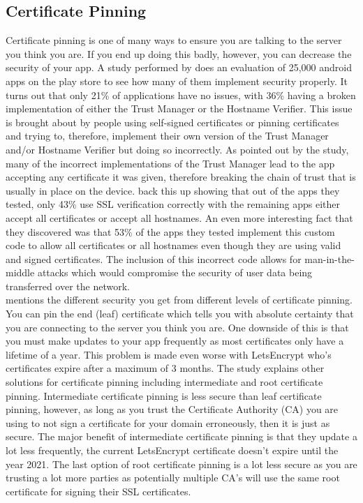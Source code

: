 \documentclass[10pt, a4paper]{article}
\begin{document}
\subsection{Certificate Pinning}
Certificate pinning is one of many ways to ensure you are talking to the server you think you are. If you end up doing this badly, however, you can decrease the security of your app. A study performed by \cite{Buhov2016} does an evaluation of 25,000 android apps on the play store to see how many of them implement security properly. It turns out that only 21\% of applications have no issues, with 36\% having a broken implementation of either the Trust Manager or the Hostname Verifier. This issue is brought about by people using self-signed certificates or pinning certificates and trying to, therefore, implement their own version of the Trust Manager and/or Hostname Verifier but doing so incorrectly. As pointed out by the study, many of the incorrect implementations of the Trust Manager lead to the app accepting any certificate it was given, therefore breaking the chain of trust that is usually in place on the device. \cite{Tendulkar2014} back this up showing that out of the apps they tested, only 43\% use SSL verification correctly with the remaining apps either accept all certificates or accept all hostnames. An even more interesting fact that they discovered was that 53\% of the apps they tested implement this custom code to allow all certificates or all hostnames even though they are using valid and signed certificates. The inclusion of this incorrect code allows for man-in-the-middle attacks which would compromise the security of user data being transferred over the network.
\\
\indent\cite{Buhov2016} mentions the different security you get from different levels of certificate pinning. You can pin the end (leaf) certificate which tells you with absolute certainty that you are connecting to the server you think you are. One downside of this is that you must make updates to your app frequently as most certificates only have a lifetime of a year. This problem is made even worse with LetsEncrypt who's certificates expire after a maximum of 3 months. The study explains other solutions for certificate pinning including intermediate and root certificate pinning. Intermediate certificate pinning is less secure than leaf certificate pinning, however, as long as you trust the Certificate Authority (CA) you are using to not sign a certificate for your domain erroneously, then it is just as secure. The major benefit of intermediate certificate pinning is that they update a lot less frequently, the current LetsEncrypt certificate doesn't expire until the year 2021. The last option of root certificate pinning is a lot less secure as you are trusting a lot more parties as potentially multiple CA's will use the same root certificate for signing their SSL certificates.
\end{document}
